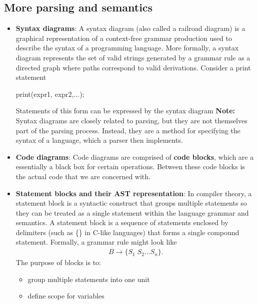 \documentclass{report}
\begin{document}
    \pagebreak 
    \subsection{More parsing and semantics}
    \begin{itemize}
        \item \textbf{Syntax diagrams}: A syntax diagram (also called a railroad diagram) is a graphical representation of a context-free grammar production used to describe the syntax of a programming language.
            \bigbreak \noindent 
            More formally, a syntax diagram represents the set of valid strings generated by a grammar rule as a directed graph where paths correspond to valid derivations. Consider a print statement
            \bigbreak \noindent 
            \begin{cppcode}
print(expr1, expr2,...);
            \end{cppcode}
            \bigbreak \noindent 
            Statements of this form can be expressed by the syntax diagram
            \bigbreak \noindent 
            \bigbreak \noindent 
            \textbf{Note:} Syntax diagrams are closely related to parsing, but they are not themselves part of the parsing process. Instead, they are a method for specifying the syntax of a language, which a parser then implements.
        \item \textbf{Code diagrams}: Code diagrams are comprised of \textbf{code blocks}, which are a essentially a black box for certain operations. Between these code blocks is the actual code that we are concerned with.
        \item \textbf{Statement blocks and their AST representation}: In compiler theory, a statement block is a syntactic construct that groups multiple statements so they can be treated as a single statement within the language grammar and semantics.
            \bigbreak \noindent 
            A statement block is a sequence of statements enclosed by delimiters (such as \{\} in C-like languages) that forms a single compound statement. Formally, a grammar rule might look like
            \begin{align*}
                B \to \{S_{1}\; S_{2} \ldots S_{n}\}
            .\end{align*}
            The purpose of blocks is to:
            \begin{itemize}
                \item group multiple statements into one unit
                \item define scope for variables

\end{itemize}
\end{itemize}
\end{document}
